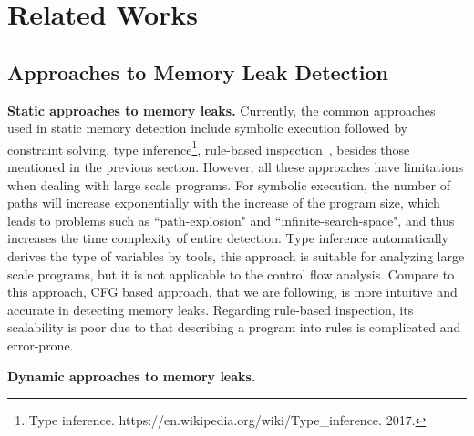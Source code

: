 \section{Related Works}\label{sec:related}

\subsection{Approaches to Memory Leak Detection}
\textbf{Static approaches to memory leaks.} 
Currently, the common approaches~\cite{YZ04} used in static memory detection include symbolic execution followed by constraint solving, type inference\footnote{Type inference. https://en.wikipedia.org/wiki/Type\_inference. 2017.}, rule-based inspection~\cite{SJP05}, besides those mentioned in the previous section. However, all these approaches have limitations when dealing with large scale programs. For symbolic execution, the number of paths will increase exponentially with the increase of the program size, which leads to problems such as ``path-explosion" and ``infinite-search-space", and thus increases the time complexity of entire detection. Type inference automatically derives the type of variables by tools, this approach is suitable for analyzing large scale programs, but it is not applicable to the control flow analysis. Compare to this approach, CFG based approach, that we are following, is more intuitive and accurate in detecting memory leaks. Regarding rule-based inspection, its scalability is poor due to that describing a program into rules is complicated and error-prone. 

\textbf{Dynamic approaches to memory leaks.} 

